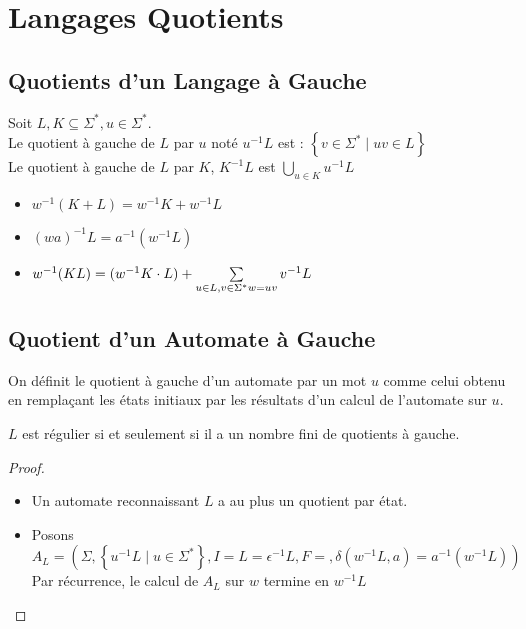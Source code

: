 \documentclass{cours}
\begin{document}
\section{Langages Quotients}
\subsection{Quotients d'un Langage à Gauche}
\begin{definition}
    Soit $L, K \subseteq \Sigma^{*}, u \in \Sigma^{*}$. \\
    Le quotient à gauche de $L$ par $u$ noté $u^{-1}L$ est : $\left\{v \in \Sigma^{*} \mid uv \in L\right\}$\\
    Le quotient à gauche de $L$ par $K$, $K^{-1}L$ est $\bigcup_{u \in K}u^{-1}L$
\end{definition}
\begin{proposition}
    \begin{itemize}
        \item $w^{-1}(K+L) = w^{-1}K + w^{-1}L$
        \item $(wa)^{-1}L = a^{-1}(w^{-1}L)$
        \item $w^{-1}(KL) = (w^{-1}K \cdot L) + \sum\limits_{u \in L, v \in \Sigma^{*}\\ w = uv} v^{-1}L$
    \end{itemize}
\end{proposition}

\subsection{Quotient d'un Automate à Gauche}
\begin{definition}
    On définit le quotient à gauche d'un automate par un mot $u$ comme celui obtenu en remplaçant les états initiaux par les résultats d'un calcul de l'automate sur $u$.
\end{definition}
\begin{proposition}
    $L$ est régulier si et seulement si il a un nombre fini de quotients à gauche.
\end{proposition}
\begin{proof}
    \begin{itemize}
        \item Un automate reconnaissant $L$ a au plus un quotient par état.
        \item Posons $A_{L} = \left(\Sigma, \left\{u^{-1}L \mid u \in \Sigma^{*} \right\}, I = L = \epsilon^{-1}L, F = , \delta(w^{-1}L, a) = a^{-1}(w^{-1}L)\right)$\\
        Par récurrence, le calcul de $A_{L}$ sur $w$ termine en $w^{-1}L$
    \end{itemize}
\end{proof}
\end{document}
